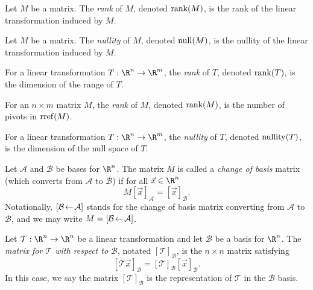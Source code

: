 \begin{SaveDefinition}[key=RankofaMatrix, title={Rank of a Matrix}]
	Let $M$ be a matrix.
	The \emph{rank} of $M$, denoted $\Rank(M)$, is the rank of
	the linear transformation induced by $M$.
\end{SaveDefinition}

\begin{SaveDefinition}[key=NullityofaMatrix, title={Nullity of a Matrix}]
	Let $M$ be a matrix.
	The \emph{nullity} of $M$, denoted $\Null(M)$, is the nullity of
	the linear transformation induced by $M$.
\end{SaveDefinition}

\begin{SaveDefinition}[key=Rank, title={Rank}]
	For a linear transformation $T:\R^n\to \R^m$, the
	\emph{rank} of $T$, denoted $\Rank(T)$, is the dimension of the range of
	$T$.

	For an $n\times m$ matrix $M$, the
	\emph{rank} of $M$, denoted $\Rank(M)$, is the number of pivots in
	$\rref(M)$.
\end{SaveDefinition}

\begin{SaveDefinition}[key=Nullity, title={Nullity}]
	For a linear transformation $T:\R^n\to \R^m$, the
	\emph{nullity} of $T$, denoted $\Nullity(T)$, is the dimension of the null space of
	$T$.
\end{SaveDefinition}

\begin{SaveDefinition}[key=ChangeofBasisMatrix, title={Change of Basis Matrix}]
	Let $\mathcal A$ and $\mathcal B$ be bases for $\R^n$. The matrix $M$ is called
	a \emph{change of basis} matrix (which converts from $\mathcal A$ to $\mathcal B$) if
	for all $\vec x\in \R^n$
	\[
		M[\vec x]_{\mathcal A}=[\vec x]_{\mathcal B}.
	\]
	 Notationally, $\BasisChange{\mathcal A}{\mathcal B}$
	stands for the change of basis matrix converting from $\mathcal A$ to $\mathcal B$,
	and we may write $M=\BasisChange{\mathcal A}{\mathcal B}$.
\end{SaveDefinition}

\begin{SaveDefinition}[key=LinearTransformationinaBasis, title={Linear Transformation in a Basis}]
	Let $\mathcal T:\R^n\to\R^n$ be a linear transformation and let $\mathcal B$ be a
	basis for $\R^n$. The \emph{matrix for $\mathcal T$ with respect to $\mathcal B$}, notated
	$[\mathcal T]_{\mathcal B}$,
	is the $n\times n$ matrix satisfying
	\[
		[\mathcal T\vec x]_{\mathcal B} = [\mathcal T]_{\mathcal B}[\vec x]_{\mathcal B}.
	\]
	In this case, we say the matrix $[\mathcal T]_{\mathcal B}$ is the representation
	of $\mathcal T$ in the $\mathcal B$ basis.
\end{SaveDefinition}

